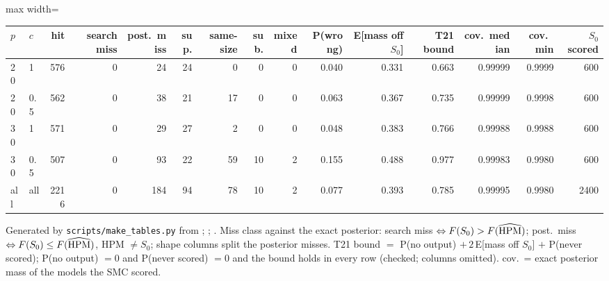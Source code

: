 \begin{center}
\scriptsize
\setlength{\tabcolsep}{2.6pt}
\begin{adjustbox}{max width=\linewidth}
\begin{tabular}{llrrrrrrrrrrrrr}
\toprule
$p$ & $c$ & hit & search miss & post.\ miss & sup. & same-size & sub. & mixed & P(wrong) & E[mass off $S_0$] & T21 bound & cov.\ median & cov.\ min & $S_0$ scored \\
\midrule
20 & 1 & 576 & 0 & 24 & 24 & 0 & 0 & 0 & 0.040 & 0.331 & 0.663 & 0.99999 & 0.9999 & 600 \\
20 & 0.5 & 562 & 0 & 38 & 21 & 17 & 0 & 0 & 0.063 & 0.367 & 0.735 & 0.99999 & 0.9998 & 600 \\
30 & 1 & 571 & 0 & 29 & 27 & 2 & 0 & 0 & 0.048 & 0.383 & 0.766 & 0.99988 & 0.9988 & 600 \\
30 & 0.5 & 507 & 0 & 93 & 22 & 59 & 10 & 2 & 0.155 & 0.488 & 0.977 & 0.99983 & 0.9980 & 600 \\
all & all & 2216 & 0 & 184 & 94 & 78 & 10 & 2 & 0.077 & 0.393 & 0.785 & 0.99995 & 0.9980 & 2400 \\
\bottomrule
\end{tabular}
\end{adjustbox}
\end{center}
\par{\footnotesize Generated by \texttt{scripts/make\_tables.py} from ; ; . Miss class against the exact posterior: search miss $\Leftrightarrow F(S_0)>F(\widehat{\rm HPM})$; post.\ miss $\Leftrightarrow F(S_0)\le F(\widehat{\rm HPM})$, HPM $\ne S_0$; shape columns split the posterior misses. T21 bound $=$ P(no output) $+\,2\,$E[mass off $S_0$] $+$ P(never scored); P(no output) $=0$ and P(never scored) $=0$ and the bound holds in every row (checked; columns omitted). cov.\ = exact posterior mass of the models the SMC scored.}\par
